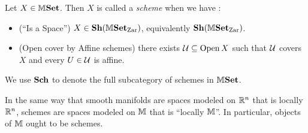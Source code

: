 \documentclass[../main.tex]{subfiles}
\begin{document}
\begin{dfn}[Schemes]
  
  Let $X \in \mathbb{M}\mathbf{Set}$.
  Then $X$ is called a \emph{scheme} when we have : 
  \begin{itemize}
    \item (``Is a Space'')
    $X \in \mathbf{Sh}(\mathbb{M}\mathbf{Set}_{\mathrm{Zar}})$, equivalently $\mathbf{Sh}(\mathbb{M}\mathbf{Set}_{\mathrm{Zar}})$.
    \item (Open cover by Affine schemes) 
    there exists $\mathcal{U} \subseteq \operatorname{Open} X$ such that 
    $\mathcal{U}$ covers $X$ and every $U \in \mathcal{U}$ is affine. 
  \end{itemize}
  We use $\mathbf{Sch}$ to denote the full subcategory 
  of schemes in $\mathbb{M}\mathbf{Set}$.
\end{dfn}

\begin{rmk}
  In the same way that smooth manifolds are spaces modeled on $\mathbb{R}^n$
  that is locally $\mathbb{R}^n$,
  schemes are spaces modeled on $\mathbb{M}$ that is ``locally $\mathbb{M}$''.
  In particular, objects of $\mathbb{M}$ ought to be schemes. 
\end{rmk}
\end{document}
